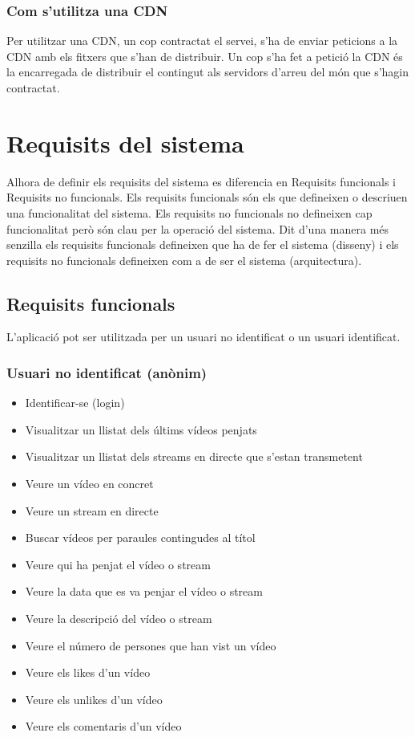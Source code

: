\documentclass[12pt, titlepage]{article}
\begin{document}
\subsubsection{Com s'utilitza una CDN}

Per utilitzar una CDN, un cop contractat el servei, s'ha de enviar peticions a
la CDN amb els fitxers que s'han de distribuir. Un cop s'ha fet a petició la CDN és
la encarregada de distribuir el contingut als servidors d'arreu del món que
s'hagin contractat.

\section{Requisits del sistema}
Alhora de definir els requisits del sistema es diferencia en Requisits funcionals
i Requisits no funcionals. Els requisits funcionals són els que defineixen o descriuen
una funcionalitat del sistema. Els requisits no funcionals no defineixen cap funcionalitat
però són clau per la operació del sistema. Dit d’una manera més senzilla els requisits
funcionals defineixen que ha de fer el sistema (disseny) i els requisits no funcionals
defineixen com a de ser el sistema (arquitectura).

\subsection{Requisits funcionals}
L’aplicació pot ser utilitzada per un usuari no identificat o un usuari identificat.

\subsubsection{Usuari no identificat (anònim)}
\begin{itemize}
\item Identificar-se (login)
\item Visualitzar un llistat dels últims vídeos penjats
\item Visualitzar un llistat dels streams en directe que s’estan transmetent
\item Veure un vídeo en concret
\item Veure un stream en directe
\item Buscar vídeos per paraules contingudes al títol
\item Veure qui ha penjat el vídeo o stream
\item Veure la data que es va penjar el vídeo o stream
\item Veure la descripció del vídeo o stream
\item Veure el número de persones que han vist un vídeo
\item Veure els likes d’un vídeo
\item Veure els unlikes d’un vídeo
\item Veure els comentaris d’un vídeo
\end{itemize}
\end{document}
